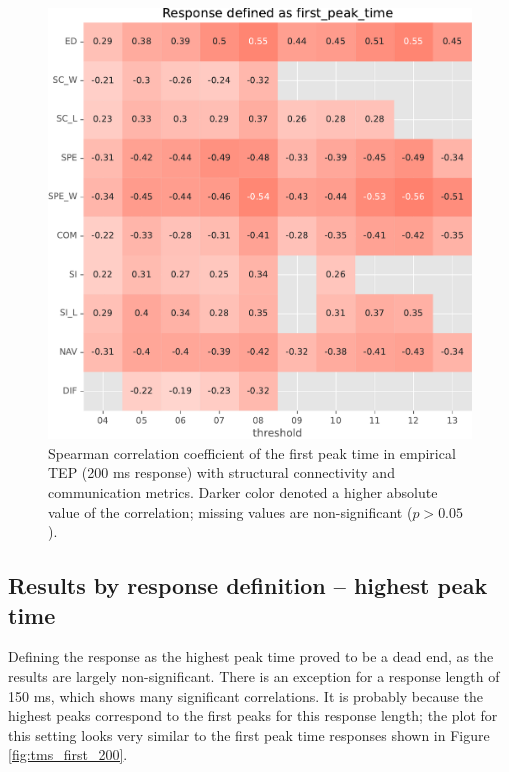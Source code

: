 \begin{figure}
    \centering
    \includegraphics[width=\textwidth]{images/nootebook_generated/pytepfit_results/empirical/200/not_over_threshold_nan/Response defined as first_peak_time.pdf}
    \caption[TEPs first peak time (200 ms) correlations]{Spearman correlation coefficient of the first peak time in empirical TEP (200 ms response) with structural connectivity and communication metrics. Darker color denoted a higher absolute value of the correlation; missing values are non-significant ($p>0.05$).}
    \label{fig:tms_first_time_200}
\end{figure}

\subsection{Results by response definition -- highest peak time}

Defining the response as the highest peak time proved to be a dead end, as the results are largely non-significant. There is an exception for a response length of 150 ms, which shows many significant correlations. It is probably because the highest peaks correspond to the first peaks for this response length; the plot for this setting looks very similar to the first peak time responses shown in Figure \ref{fig:tms_first_200}. 

